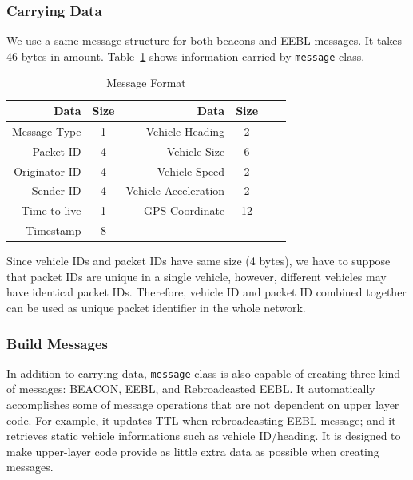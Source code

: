 \documentclass[twocolumn]{article}
\begin{document}
\subsubsection{Carrying Data}
\par{We use a same message structure for both beacons and EEBL messages. It takes 46 bytes in amount. Table~\ref{tab:data} shows information carried by {\tt message} class.}
\begin{table}[htb]
    \begin{tabular}{|r|c|r|c|r|c|}
        \hline  
        {\bf Data}      & {\bf Size}    & {\bf Data}            & {\bf Size}    \\ \hline
        Message Type    &   1           & Vehicle Heading       &   2           \\ \hline
        Packet ID       &   4           & Vehicle Size          &   6           \\ \hline
        Originator ID   &   4           & Vehicle Speed         &   2           \\ \hline
        Sender ID       &   4           & Vehicle Acceleration  &   2           \\ \hline
        Time-to-live    &   1           & GPS Coordinate        &   12          \\ \hline
        Timestamp       &   8           &                       &               \\ \hline
    \end{tabular}
    \caption{Message Format}
    \label{tab:data}
\end{table}
\par{Since vehicle IDs and packet IDs have same size (4 bytes), we have to suppose that packet IDs are unique in a single vehicle, however, different vehicles may have identical packet IDs. Therefore, vehicle ID and packet ID combined together can be used as unique packet identifier in the whole network.}
\subsubsection{Build Messages}
\par{In addition to carrying data, {\tt message} class is also capable of creating three kind of messages: BEACON, EEBL, and Rebroadcasted EEBL. It automatically accomplishes some of message operations that are not dependent on upper layer code. For example, it updates TTL when rebroadcasting EEBL message; and it retrieves static vehicle informations such as vehicle ID/heading. It is designed to make upper-layer code provide as little extra data as possible when creating messages.}
\end{document}

